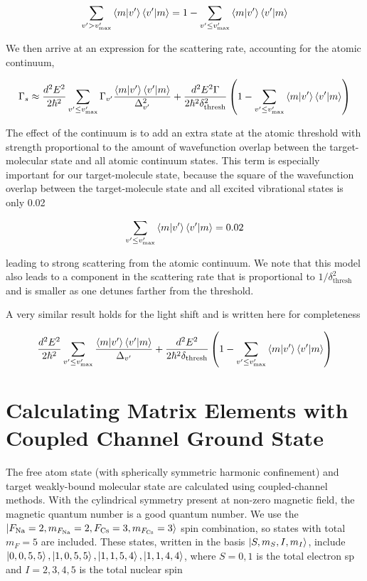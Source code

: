 \documentclass[aps,secnumarabic,amsmath,amssymb,superscriptaddress]{revtex4}
\newcommand{\todo}[1]{}
\begin{document}
\begin{equation}
    \displaystyle\sum_{v' > v'_{\text{max}}}\braket{m|v'}\braket{v'|m} = 1 - \displaystyle\sum_{v' \leq v'_{\text{max}}}\braket{m|v'}\braket{v'|m}
\end{equation}

We then arrive at an expression for the scattering rate, accounting for the atomic continuum,

\begin{equation}
    \Gamma_s \approx \frac{d^2E^2}{2\hbar^2}\displaystyle\sum_{v' \leq v'_{\text{max}}}\Gamma_{v'} \frac{\braket{m|v'}\braket{v'|m}}{\Delta_{v'}^2} +  \frac{d^2E^2\Gamma}{2\hbar^2\delta_{\text{thresh}}^2}\left(1 - \displaystyle\sum_{v' \leq v'_{\text{max}}}\braket{m|v'}\braket{v'|m}\right)
\end{equation}

The effect of the continuum is to add an extra state at the atomic threshold with strength proportional to the amount of wavefunction overlap between the target-molecular state and all atomic continuum states. This term is especially important for our target-molecule state, because the square of the wavefunction overlap between the target-molecule state and all excited vibrational states is only 0.02

\begin{equation}
\displaystyle\sum_{v' \leq v'_{\text{max}}}\braket{m|v'}\braket{v'|m} = 0.02
\end{equation}

leading to strong scattering from the atomic continuum. We note that this model also leads to a component in the scattering rate that is proportional to $ 1/\delta_{\text{thresh}}^2$ and is smaller as one detunes farther from the threshold. 

A very similar result holds for the light shift and is written here for completeness

\begin{equation}
    \frac{d^2E^2}{2\hbar^2}\displaystyle\sum_{v' \leq v'_{\text{max}}} \frac{\braket{m|v'}\braket{v'|m}}{\Delta_{v'}} +  \frac{d^2E^2}{2\hbar^2\delta_{\text{thresh}}}\left(1 - \displaystyle\sum_{v' \leq v'_{\text{max}}}\braket{m|v'}\braket{v'|m}\right)
\end{equation}


\section{Calculating Matrix Elements with Coupled Channel Ground State}
The free atom state (with spherically symmetric harmonic confinement) and target weakly-bound molecular state are calculated using coupled-channel methods. With the cylindrical symmetry present at non-zero magnetic field, the magnetic quantum number is a good quantum number. We use the $ \ket{F_{\text{Na}} = 2, m_{F_{\text{Na}}} = 2, F_{\text{Cs}} = 3, m_{F_{\text{Cs}}} = 3}$ spin combination, so states with total $ m_F = 5 $ are included. These states, written in the basis $ \ket{S, m_S, I, m_I}$, include $ \ket{0,0,5,5}, \ket{1,0,5,5}, \ket{1,1,5,4}, \ket{1,1,4,4} $, where $S = 0,1$ is the total electron sp and $ I = 2,3,4,5 $ is the total nuclear spin

\todo{
  Power/intensity calibration
}


\end{document}
